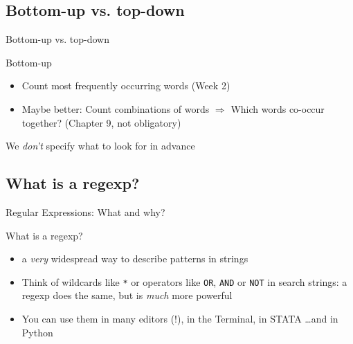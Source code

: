 \documentclass{beamer}
\begin{document}
\subsection{Bottom-up vs. top-down}

\begin{frame}{Bottom-up vs. top-down}
	\begin{block}{Bottom-up}
	\begin{itemize}
		\item Count most frequently occurring words (Week 2)
		\item Maybe better: Count combinations of words $\Rightarrow$ Which words co-occur together? (Chapter 9, not obligatory)
	\end{itemize}
	We \emph{don't} specify what to look for in advance	
	\end{block}
	
\end{frame}




\subsection{What is a regexp?}
\begin{frame}{Regular Expressions: What and why?}
\begin{block}{What is a regexp?}
\begin{itemize}
\item<1-> a \emph{very} widespread way to describe patterns in strings
\item<2-> Think of wildcards like {\tt{*}} or operators like {\tt{OR}}, {\tt{AND}} or {\tt{NOT}} in search strings: a regexp does the same, but is \emph{much} more powerful
\item<3-> You can use them in many editors (!), in the Terminal, in STATA \ldots and in Python
\end{itemize}
\end{block}
\end{frame}
\end{document}
